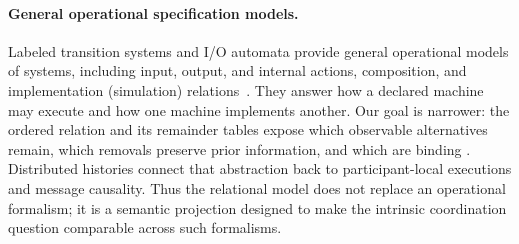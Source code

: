 \paragraph{General operational specification models.}
Labeled transition systems and I/O automata provide general operational models
of systems, including input, output, and internal actions, composition, and
implementation (simulation) relations~\cite{lynch1987io,lynch1996distributed}.  They answer how a declared
machine may execute and how one machine implements another.  Our goal is
narrower: the ordered relation and its remainder tables expose which observable
alternatives remain, which removals preserve prior information, and which are
binding \commitments.  Distributed histories connect that abstraction back to
participant-local executions and message causality.  Thus the relational model
does not replace an operational formalism; it is a semantic
projection designed to make the intrinsic coordination question comparable
across such formalisms.

